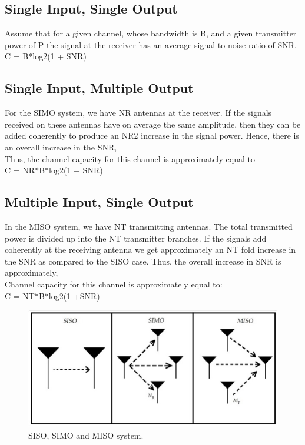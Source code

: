 \documentclass[12pt]{report}
\begin{document}
\subsection*{Single Input, Single Output}
Assume that for a given channel, whose bandwidth is B, and a given
transmitter power of P the signal at the receiver has an average signal
to noise ratio of SNR.\\
C = B*log2(1 + SNR) 
\subsection*{Single Input, Multiple Output}
For the SIMO system, we have NR antennas at the receiver. If the signals
received on these antennas have on average the same amplitude, then
they can be added coherently to produce an NR2 increase in the signal
power. Hence, there is an overall increase in the SNR,\\
Thus, the channel capacity for this channel is approximately equal to\\
C = NR*B*log2(1 + SNR)
\subsection*{Multiple Input, Single Output}
In the MISO system, we have NT transmitting antennas. The total
transmitted power is divided up into the NT transmitter branches. If the
signals add coherently at the receiving antenna we get approximately
an NT fold increase in the SNR as compared to the SISO case. Thus,
the overall increase in SNR is approximately,\\
Channel capacity for this channel is approximately equal to:\\
C = NT*B*log2(1 +SNR)


\begin{figure}[!hbt]
		\begin{center}
		\includegraphics[width=\columnwidth]{sisosimomiso}
		\caption{SISO, SIMO and MISO system.}
		\label{fig:tf_plot}
		\end{center}
	\end{figure}
\end{document}
